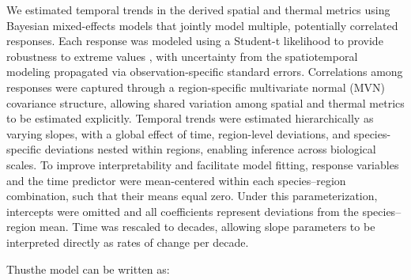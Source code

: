 \documentclass[9pt,twocolumn,twoside]{pnas-new}
\providecommand{\DIFadd}[1]{{\protect\color{blue}\uwave{#1}}} %
\providecommand{\DIFaddbegin}{} %
\providecommand{\DIFaddend}{} %
\providecommand{\DIFdelbegin}{} %
\providecommand{\DIFdelend}{} %
\begin{document}
{We estimated temporal trends in the derived spatial and thermal metrics using Bayesian mixed-effects models that jointly model multiple, potentially correlated responses. Each response was modeled using a Student-t likelihood to provide robustness to extreme values \citep[e.g.,][]{anderson_black-swan_2017}, with uncertainty from the spatiotemporal modeling propagated via observation-specific standard errors. Correlations among responses were captured through a region-specific multivariate normal (MVN) covariance structure, allowing shared variation among spatial and thermal metrics to be estimated explicitly. Temporal trends were estimated hierarchically as varying slopes, with a global effect of time, region-level deviations, and species-specific deviations nested within regions, enabling inference across biological scales. To improve interpretability and facilitate model fitting, response variables and the time predictor were mean-centered within each species–region combination, such that their means equal zero. Under this parameterization, intercepts were omitted and all coefficients represent deviations from the species–region mean. Time was rescaled to decades, allowing slope parameters to be interpreted directly as rates of change per decade.
\DIFdelbegin %

\DIFdelend Thus\DIFaddbegin \DIFadd{, }\DIFaddend the model can be written as:
\DIFdelbegin %

}
\end{document}
